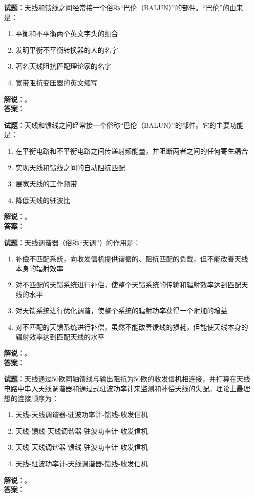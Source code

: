 \documentclass{ctexbook}
\begin{document}
\bigskip




\noindent\textbf{试题：}天线和馈线之间经常接一个俗称“巴伦（BALUN）”的部件。“巴伦”的由来是：
\begin{enumerate}[leftmargin=3em]
\item 平衡和不平衡两个英文字头的组合
\item 发明平衡不平衡转换器的人的名字
\item 著名天线阻抗匹配理论家的名字
\item 宽带阻抗变压器的英文缩写
\end{enumerate}
\noindent\textbf{解说：}\textbf{}。\\\noindent\textbf{答案：}

\bigskip




\noindent\textbf{试题：}天线和馈线之间经常接一个俗称“巴伦（BALUN）”的部件。它的主要功能是：
\begin{enumerate}[leftmargin=3em]
\item 在平衡电路和不平衡电路之间传递射频能量，并阻断两者之间的任何寄生耦合
\item 实现天线和馈线之间的自动阻抗匹配
\item 展宽天线的工作频带
\item 降低天线的驻波比
\end{enumerate}
\noindent\textbf{解说：}\textbf{}。\\\noindent\textbf{答案：}

\bigskip




\noindent\textbf{试题：}天线调谐器（俗称“天调”）的作用是：
\begin{enumerate}[leftmargin=3em]
\item 补偿不匹配系统，向收发信机提供谐振的、阻抗匹配的负载，但不能改善天线本身的辐射效率
\item 对不匹配的天馈系统进行补偿，使整个天馈系统的传输和辐射效率达到匹配天线的水平
\item 对天馈系统进行优化调谐，使整个系统的辐射功率获得一个附加的增益
\item 对不匹配的天馈系统进行补偿，虽然不能改善馈线的损耗，但能使天线本身的辐射效率达到匹配天线的水平
\end{enumerate}
\noindent\textbf{解说：}\textbf{}。\\\noindent\textbf{答案：}

\bigskip




\noindent\textbf{试题：}天线通过50欧同轴馈线与输出阻抗为50欧的收发信机相连接，并打算在天线电路中串入天线调谐器和通过式驻波功率计来监测和补偿天线的失配。理论上最理想的连接顺序为：
\begin{enumerate}[leftmargin=3em]
\item 天线-天线调谐器-驻波功率计-馈线-收发信机
\item 天线-馈线-天线调谐器-驻波功率计-收发信机
\item 天线-天线调谐器-馈线-驻波功率计-收发信机
\item 天线-驻波功率计-天线调谐器-馈线-收发信机
\end{enumerate}
\noindent\textbf{解说：}\textbf{}。\\\noindent\textbf{答案：}
\end{document}
